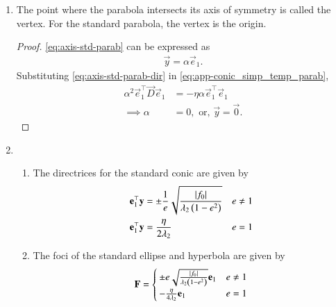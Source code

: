 \begin{enumerate}[label=\thesubsection.\arabic*.,ref=\thesubsection.\theenumi]
	\item
			\label{corr:center-parab}
 The point where the parabola intersects its axis of symmetry is called the vertex. For the standard parabola, the vertex is the origin.
	
	\begin{proof}
					\eqref{eq:axis-std-parab} can be expressed as 
    \begin{align}
			\vec{y}= \alpha \vec{e}_1. 
					\label{eq:axis-std-parab-dir} 
    \end{align}
					Substituting \eqref{eq:axis-std-parab-dir} in 
    \eqref{eq:app-conic_simp_temp_parab}, 
    \begin{align}
	     \alpha^2 \vec{e}_1^{\top}\vec{D} \vec{e}_1 &=  -\eta\alpha \vec{e}_1^{\top} \vec{e}_1   
	     \\
	     \implies \alpha &=0, \text{ or, } \vec{y} = \vec{0}.
    \end{align}
	\end{proof}
    \item\leavevmode
		\begin{enumerate}
			\item The directrices for the  standard conic are given by 
				\begin{align}
					\label{eq:app-dx-ell-hyp}
					\mathbf{e}_1^{\top}\mathbf{y} &=  
					\pm \frac{1}{e}\sqrt{\frac{\left\vert f_0\right\vert}{\lambda_2\left(1-e^2\right)}} & e \ne 1
					\\
					\mathbf{e}_1^{\top}\mathbf{y} &= \frac{\eta}{2\lambda_2} & e = 1
					\label{eq:app-dx-parab}
				\end{align}
    \item The foci of the standard ellipse and hyperbola are given by 
				\begin{align}
					\label{eq:app-F-ell-hyp-parab}
					\mathbf{F} 
=
					\begin{cases}
						\pm e\sqrt{\frac{\left\vert f_0\right\vert}{\lambda_2\left(1-e^2\right)}}\mathbf{e}_1 & e \ne 1
						\\
						 -\frac{\eta}{4\lambda_2}\mathbf{e}_1 & e = 1
					\end{cases}
				\end{align}
	
		\end{enumerate}
    

\end{enumerate}
